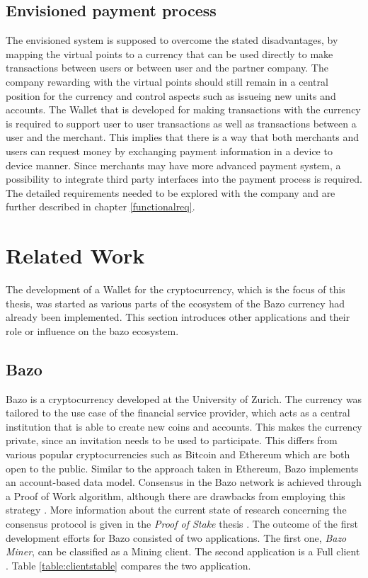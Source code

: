 \subsection{Envisioned payment process}\label{envisionedpaymentprocess}
The envisioned system is supposed to overcome the stated disadvantages, by mapping the virtual points to a currency that can be used directly to make transactions between users or between user and the partner company.
The company rewarding with the virtual points should still remain in a central position for the currency and control aspects such as issueing new units and accounts.
The Wallet that is developed for making transactions with the currency is required to support user to user transactions as well as transactions between a user and the merchant. This implies that there is a way that both merchants and users can request money by exchanging payment information in a device to device manner. Since merchants may have more advanced payment system, a possibility to integrate third party interfaces into the payment process is required. The detailed requirements needed to be explored with the company and are further described in chapter \ref{functionalreq}.


\section{Related Work}
The development of a Wallet for the cryptocurrency, which is the focus of this thesis, was started as various parts of the ecosystem of the Bazo currency had already been implemented. This section introduces other applications and their role or influence on the bazo ecosystem.
\subsection{Bazo}
Bazo is a cryptocurrency developed at the University of Zurich. The currency was tailored to the use case of the financial service provider, which acts as a central institution that is able to create new coins and accounts. This makes the currency private, since an invitation needs to be used to participate. This differs from various popular cryptocurrencies such as Bitcoin and Ethereum which are both open to the public. Similar to the approach taken in Ethereum, Bazo implements an account-based data model. Consensus in the Bazo network is achieved through a Proof of Work algorithm, although there are drawbacks from employing this strategy \cite{lisg}. More information about the current state of research concerning the consensus protocol is given in the \textit{Proof of Stake} thesis \cite{proofofstake}.
The outcome of the first development efforts for Bazo consisted of two applications. The first one, \textit{Bazo Miner}, can be classified as a Mining client. The second application is a Full client \cite{bitcoinclients}. Table \ref{table:clientstable} compares the two application.
